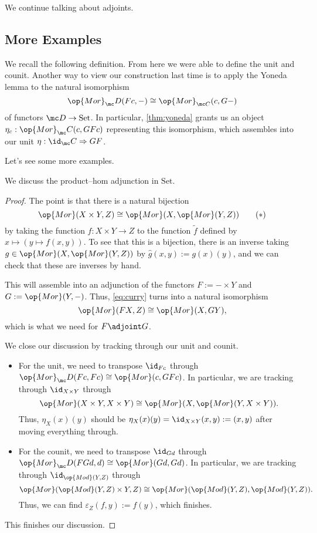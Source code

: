 
We continue talking about adjoints.

\subsection{More Examples}
We recall the following definition.
\adjdefi*
\noindent From here we were able to define the unit and counit. Another way to view our construction last time is to apply the Yoneda lemma to the natural isomorphism
\[\op{Mor}_\mc D(Fc,-)\cong\op{Mor}_{\mc C}(c,G-)\]
of functors $\mc D\to\mathrm{Set}$. In particular, \autoref{thm:yoneda} grants us an object $\eta_c:\op{Mor}_\mc C(c,GFc)$ representing this isomorphism, which assembles into our unit $\eta:\id_\mc C\Rightarrow GF$.

Let's see some more examples.
\begin{exe}
	We discuss the product--hom adjunction in $\mathrm{Set}$.
\end{exe}
\begin{proof}
	The point is that there is a natural bijection
	\[\op{Mor}(X\times Y,Z)\cong\op{Mor}(X,\op{Mor}(Y,Z))\label{eq:curry}\tag{$*$}\]
	by taking the function $f:X\times Y\to Z$ to the function $\widetilde f$ defined by $x\mapsto(y\mapsto f(x,y))$. To see that this is a bijection, there is an inverse taking $g\in\op{Mor}(X,\op{Mor}(Y,Z))$ by $\hat g(x,y):=g(x)(y)$, and we can check that these are inverses by hand.
	
	This will assemble into an adjunction of the functors $F:=-\times Y$ and $G:=\op{Mor}(Y,-)$. Thus, \autoref{eq:curry} turns into a natural isomorphism
	\[\op{Mor}(FX,Z)\cong\op{Mor}(X,GY),\]
	which is what we need for $F\adjoint G$.

	We close our discussion by tracking through our unit and counit.
	\begin{itemize}
		\item For the unit, we need to transpose $\id_{Fc}$ through $\op{Mor}_\mc D(Fc,Fc)\cong\op{Mor}(c,GFc)$. In particular, we are tracking through $\id_{X\times Y}$ through
		\[\op{Mor}(X\times Y,X\times Y)\cong\op{Mor}(X,\op{Mor}(Y,X\times Y)).\]
		Thus, $\eta_X(x)(y)$ should be $\eta_X(x)(y)=\id_{X\times Y}(x,y):=(x,y)$ after moving everything through.
		\item For the counit, we need to transpose $\id_{Gd}$ through $\op{Mor}_\mc D(FGd,d)\cong\op{Mor}(Gd,Gd)$. In particular, we are tracking through $\id_{\op{Mod}(Y,Z)}$ through
		\[\op{Mor}(\op{Mod}(Y,Z)\times Y,Z)\cong\op{Mor}(\op{Mod}(Y,Z),\op{Mod}(Y,Z)).\]
		Thus, we can find $\varepsilon_Z(f,y):=f(y)$, which finishes.
	\end{itemize}
	This finishes our discussion.
\end{proof}
